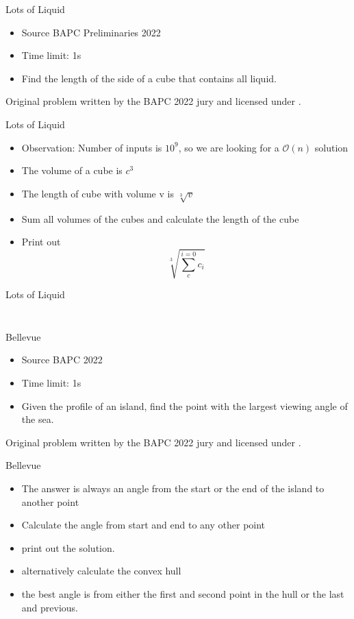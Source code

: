 \documentclass[11pt,pdf, aspectratio=169]{beamer}
\begin{document}
  \begin{frame}{Lots of Liquid}
    \begin{itemize}
      \item Source BAPC Preliminaries 2022
      \item Time limit: 1s
      \item Find the length of the side of a cube that contains all liquid.
    \end{itemize}
    Original problem written by the BAPC 2022 jury and licensed under \doclicenseLongNameRef.
    \doclicenseImage
  \end{frame}
  \begin{frame}{Lots of Liquid}
    \begin{itemize}
      \item Observation: Number of inputs is $10^9$, so we are looking for a $\mathcal{O}(n)$ solution
      \item The volume of a cube is $c^3$
      \item The length of cube with volume v is $\sqrt[3]{v}$
      \item Sum all volumes of the cubes and calculate the length of the cube
      \item Print out \[\sqrt[3]{\sum_c^{i=0}c_i}\]
    \end{itemize}
  \end{frame}
  \begin{frame}[containsverbatim]{Lots of Liquid}
    \inputminted{python}{code/session-1/python/dapc-l.py}
    \inputminted{kotlin}{code/session-1/kotlin/dapc-l.kt}
  \end{frame}
  \begin{frame}{Bellevue}
    \begin{itemize}
      \item Source BAPC 2022
      \item Time limit: 1s
      \item  Given the profile of an island, find the point with the largest viewing angle of the sea.
    \end{itemize}
    Original problem written by the BAPC 2022 jury and licensed under \doclicenseLongNameRef.
    \doclicenseImage
  \end{frame}
  \begin{frame}{Bellevue}
    \begin{itemize}
      \item The answer is always an angle from the start or the end of the island to another point
      \item Calculate the angle from start and end to any other point
      \item print out the solution.\\
      \item alternatively calculate the convex hull
      \item the best angle is from either the first and second point in the hull or the last and previous.
    \end{itemize}
  \end{frame}
\end{document}
